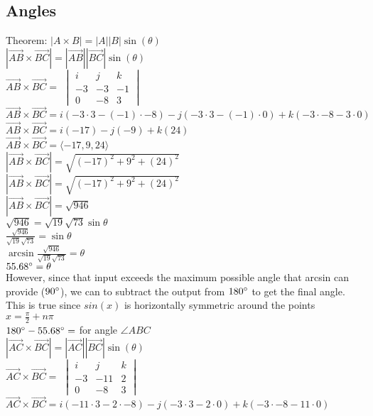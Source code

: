 \documentclass{article}
\begin{document}
\subsection{Angles}
Theorem: $|A\times B|=|A||B|\sin(\theta)$
\\[0.1in]$|\vec{AB}\times \vec{BC}|=|\vec{AB}||\vec{BC}|\sin(\theta)$
\\[0.1in]$\vec{AB} \times \vec{BC} = $
$\begin{vmatrix}
i & j & k \\
-3 & -3 & -1 \\
0 & -8 & 3
\end{vmatrix}$
\\$\vec{AB} \times \vec{BC} = i(-3\cdot3-(-1)\cdot -8)-j(-3\cdot 3-(-1)\cdot 0)+k(-3\cdot-8-3\cdot 0)$
\\$\vec{AB} \times \vec{BC} = i(-17)-j(-9)+k(24)$
\\$\vec{AB} \times \vec{BC} = \langle-17,9,24\rangle$
\\$|\vec{AB} \times \vec{BC}| = \sqrt{(-17)^2+9^2+(24)^2}$
\\$|\vec{AB} \times \vec{BC}| = \sqrt{(-17)^2+9^2+(24)^2}$
\\[0.1in]$|\vec{AB} \times \vec{BC}| = \sqrt{946}$
\\[0.1in]$\sqrt{946}=\sqrt{19}\sqrt{73}\sin\theta$
\\[0.1in]$\frac{\sqrt{946}}{\sqrt{19}\sqrt{73}}=\sin\theta$
\\[0.1in]$\arcsin\frac{\sqrt{946}}{\sqrt{19}\sqrt{73}}=\theta$
\\[0.1in]$55.68\degree=\theta$ 
\\[0.1in]However, since that input exceeds the maximum possible angle that arcsin can provide ($90\degree$), we can to subtract the output from $180\degree$ to get the final angle. This is true since $sin(x)$ is horizontally symmetric around the points $x=\frac{\pi}{2}+n\pi$
\\[0.1in]$180\degree-55.68\degree=$ \boxed{\theta =124.32\degree} for angle $\angle ABC$
\\[0.1in]$|\vec{AC}\times \vec{BC}|=|\vec{AC}||\vec{BC}|\sin(\theta)$
\\[0.1in]$\vec{AC} \times \vec{BC} = $
$\begin{vmatrix}
i & j & k \\
-3 & -11 & 2 \\
0 & -8 & 3
\end{vmatrix}$
\\[0.1in]$\vec{AC} \times \vec{BC} = i(-11\cdot3-2\cdot -8)-j(-3\cdot 3-2\cdot 0)+k(-3\cdot-8-11\cdot 0)$
\end{document}
